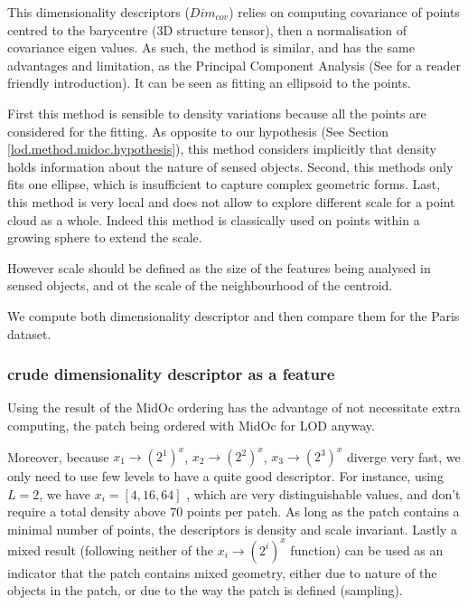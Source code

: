 		
		This dimensionality descriptors ($Dim_{cov}$) relies on computing covariance of points centred to the barycentre (3D structure tensor), then a normalisation of covariance eigen values.
		As such, the method is similar, and has the same advantages and limitation, as the Principal Component Analysis (See \cite{Shlens2014} for a reader friendly introduction).
		It can be seen as fitting an ellipsoid to the points.
		
		First this method is sensible to density variations because all the points are considered for the fitting. 
		As opposite to our hypothesis (See Section \ref{lod.method.midoc.hypothesis}),
		this method considers implicitly that density holds information about the nature of sensed objects. 
		Second, this methods only fits one ellipse, which is insufficient to capture complex geometric forms. 
		Last, this method is very local and does not allow to explore different scale for a point cloud as a whole. Indeed this method is classically used on points within a growing sphere to extend the scale.
		
		However scale should be defined as the size of the features being analysed in sensed objects, and ot the scale of the neighbourhood of the centroid.
		
		We compute both dimensionality descriptor and then compare them for the Paris dataset.
		
		\subsubsection{crude dimensionality descriptor as a feature}

		Using the result of the MidOc ordering has the advantage of not necessitate extra computing,
		the patch being ordered with MidOc for LOD anyway.
		
		Moreover, because $x_1 \rightarrow (2^1)^x$,
		$x_2 \rightarrow (2^2)^x$, $x_3 \rightarrow (2^3)^x$ diverge very fast,
		we only need to use few levels to have a quite good descriptor.
		For instance, using $L=2$, we have $x_i=[4,16,64]$ , which are very distinguishable values, and don't require a total density above $70$ points per patch.  
		As long as the patch contains a minimal number of points, the descriptors is density and scale invariant.
		Lastly a mixed result (following neither of the $x_i \rightarrow (2^i)^x$ function) can be used as an indicator that the patch contains mixed geometry, either due to nature of the objects in the patch, or due to the way the patch is defined (sampling).
		
